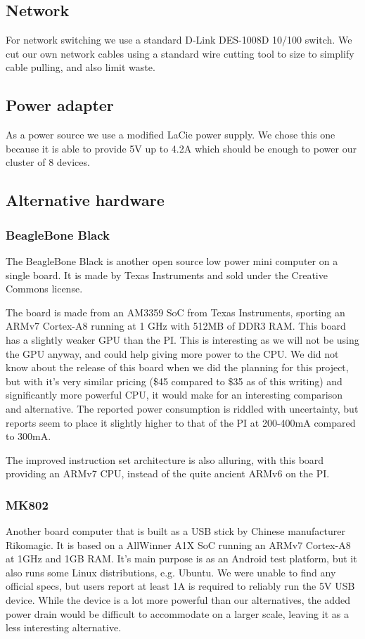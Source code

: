 \subsection{Network}
For network switching we use a standard D-Link DES-1008D 10/100 switch. We cut our own network cables using a standard wire cutting tool to size to simplify cable pulling, and also limit waste.

\subsection{Power adapter}
As a power source we use a modified LaCie power supply. We chose this one because it is able to provide 5V up to 4.2A which should be enough to power our cluster of 8 devices. 

\subsection{Alternative hardware}

\subsubsection{BeagleBone Black}
The BeagleBone Black is another open source low power mini computer on a single board. It is made by Texas Instruments and sold under the Creative Commons license.

The board is made from an AM3359 SoC from Texas Instruments, sporting an ARMv7 Cortex-A8 running at 1 GHz with 512MB of DDR3 RAM. This board has a slightly weaker GPU than the PI. This is interesting as we will not be using the GPU anyway, and could help giving more power to the CPU.
We did not know about the release of this board when we did the planning for this project, but with it's very similar pricing (\$45 compared to \$35 as of this writing) and significantly more powerful CPU, it would make for an interesting comparison and alternative. The reported power consumption is riddled with uncertainty, but reports seem to place it slightly higher to that of the PI at 200-400mA compared to 300mA.

The improved instruction set architecture is also alluring, with this board providing an ARMv7 CPU, instead of the quite ancient ARMv6 on the PI.

\subsubsection{MK802}
Another board computer that is built as a USB stick by Chinese manufacturer Rikomagic.
It is based on a AllWinner A1X SoC running an ARMv7 Cortex-A8 at 1GHz and 1GB RAM. It's main purpose is as an Android test platform, but it also runs some Linux distributions, e.g. Ubuntu.
We were unable to find any official specs, but users report at least 1A is required to reliably run the 5V USB device. 
While the device is a lot more powerful than our alternatives, the added power drain would be difficult to accommodate on a larger scale, leaving it as a less interesting alternative.

